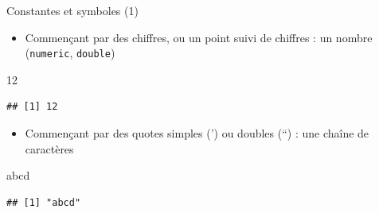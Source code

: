 \documentclass[
  ignorenonframetext,
]{beamer}
\newenvironment{Shaded}{\begin{snugshade}}{\end{snugshade}}
\newcommand{\DecValTok}[1]{\textcolor[rgb]{0.00,0.00,0.81}{#1}}
\newcommand{\StringTok}[1]{\textcolor[rgb]{0.31,0.60,0.02}{#1}}
\providecommand{\tightlist}{%
  \setlength{\itemsep}{0pt}\setlength{\parskip}{0pt}}
\begin{document}
\begin{frame}[fragile]{Constantes et symboles (1)}
\protect\hypertarget{constantes-et-symboles-1}{}
\begin{itemize}
\tightlist
\item
  Commençant par des chiffres, ou un point suivi de chiffres : un nombre
  (\texttt{numeric}, \texttt{double})
\end{itemize}

\tiny

\begin{Shaded}
\begin{Highlighting}[]
\DecValTok{12}
\end{Highlighting}
\end{Shaded}

\begin{verbatim}
## [1] 12
\end{verbatim}

\normalsize

\begin{itemize}
\tightlist
\item
  Commençant par des quotes simples (') ou doubles (``) : une chaîne de
  caractères
\end{itemize}

\tiny

\begin{Shaded}
\begin{Highlighting}[]
\StringTok{\textquotesingle{}abcd\textquotesingle{}}
\end{Highlighting}
\end{Shaded}

\begin{verbatim}
## [1] "abcd"
\end{verbatim}

\normalsize
\end{frame}
\end{document}
